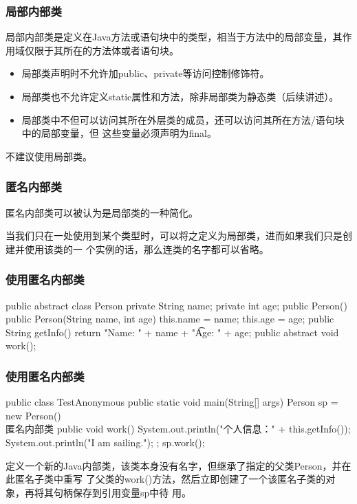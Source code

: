 \begin{frame}[fragile] %
\frametitle{局部内部类}

局部内部类是定义在Java方法或语句块中的类型，相当于方法中的局部变量，其作用域仅限于其所在的方法体或者语句块。

\begin{itemize}\kai
\item 局部类声明时不允许加public、private等访问控制修饰符。
\item 局部类也不允许定义static属性和方法，{\Red 除非局部类为静态类（后续讲述）}。
\item 局部类中不但可以访问其所在外层类的成员，还可以访问其所在方法/语句块中的局部变量，但
  这些变量必须声明为{\Red final}。
\end{itemize}


{\hei\Red 不建议使用局部类。}
\end{frame}

\begin{frame}[fragile] %
\frametitle{匿名内部类}
匿名内部类可以被认为是局部类的一种简化。

{\kai 当我们只在一处使用到某个类型时，可以将之定义为局部类，进而如果我们只是创建并使用该类的一
个实例的话，那么连类的名字都可以省略。}
\end{frame}

\begin{frame}[fragile] %
\frametitle{使用匿名内部类}


\begin{javaCode}
public abstract class Person {
  private String name;
  private int age;
  public Person() {}
  public Person(String name, int age) {
    this.name = name;
    this.age = age;
  }
  public String getInfo() {
    return "Name: " + name + "\t Age: " + age;
  }
  public abstract void work();
}  
\end{javaCode}
\end{frame}

\begin{frame}[fragile] %
\frametitle{使用匿名内部类}

\begin{javaCode}
public class TestAnonymous {
  public static void main(String[] args) {
    Person sp = new Person() { \\ 匿名内部类
      public void work() {
        System.out.println("个人信息：" + this.getInfo());
        System.out.println("I am sailing.");
      }
    };
    sp.work();
  }
}
\end{javaCode}


{\small
定义一个新的Java内部类，该类本身没有名字，但继承了指定的父类Person，并在此匿名子类中重写
了父类的work()方法，然后立即创建了一个该匿名子类的对象，再将其句柄保存到引用变量sp中待
用。}
\end{frame}

